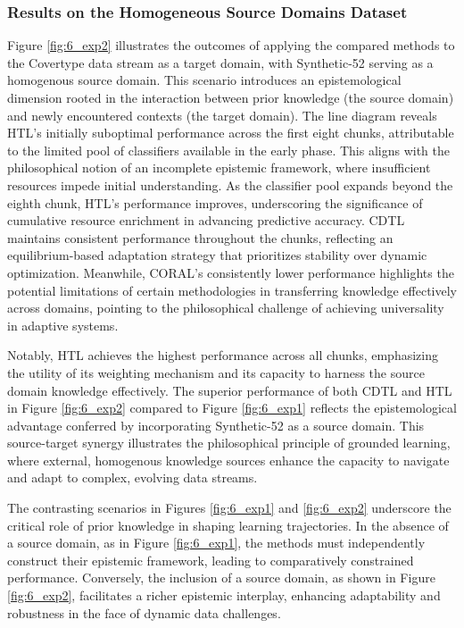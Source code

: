 \subsubsection{Results on the Homogeneous Source Domains Dataset}
Figure \ref{fig:6_exp2} illustrates the outcomes of applying the compared methods to the Covertype data stream as a target domain, with Synthetic-52 serving as a homogenous source domain. This scenario introduces an epistemological dimension rooted in the interaction between prior knowledge (the source domain) and newly encountered contexts (the target domain). The line diagram reveals HTL’s initially suboptimal performance across the first eight chunks, attributable to the limited pool of classifiers available in the early phase. This aligns with the philosophical notion of an incomplete epistemic framework, where insufficient resources impede initial understanding. As the classifier pool expands beyond the eighth chunk, HTL’s performance improves, underscoring the significance of cumulative resource enrichment in advancing predictive accuracy. CDTL maintains consistent performance throughout the chunks, reflecting an equilibrium-based adaptation strategy that prioritizes stability over dynamic optimization. Meanwhile, CORAL’s consistently lower performance highlights the potential limitations of certain methodologies in transferring knowledge effectively across domains, pointing to the philosophical challenge of achieving universality in adaptive systems.  

Notably, HTL achieves the highest performance across all chunks, emphasizing the utility of its weighting mechanism and its capacity to harness the source domain knowledge effectively. The superior performance of both CDTL and HTL in Figure \ref{fig:6_exp2} compared to Figure \ref{fig:6_exp1} reflects the epistemological advantage conferred by incorporating Synthetic-52 as a source domain. This source-target synergy illustrates the philosophical principle of grounded learning, where external, homogenous knowledge sources enhance the capacity to navigate and adapt to complex, evolving data streams.  

The contrasting scenarios in Figures \ref{fig:6_exp1} and \ref{fig:6_exp2} underscore the critical role of prior knowledge in shaping learning trajectories. In the absence of a source domain, as in Figure \ref{fig:6_exp1}, the methods must independently construct their epistemic framework, leading to comparatively constrained performance. Conversely, the inclusion of a source domain, as shown in Figure \ref{fig:6_exp2}, facilitates a richer epistemic interplay, enhancing adaptability and robustness in the face of dynamic data challenges.


